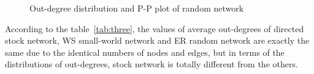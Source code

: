 \begin{figure} %
	\centering
	
	
	\caption{Out-degree distribution and P-P plot of random network}
	\label{fig:distributionrd}
\end{figure}

According to the table~\ref{tab:three}, the values of average out-degrees of directed stock network, WS small-world network and ER random network are exactly the same due to the identical numbers of nodes and edges, but in terms of the distributions of out-degrees, stock network is totally different from the others. 

